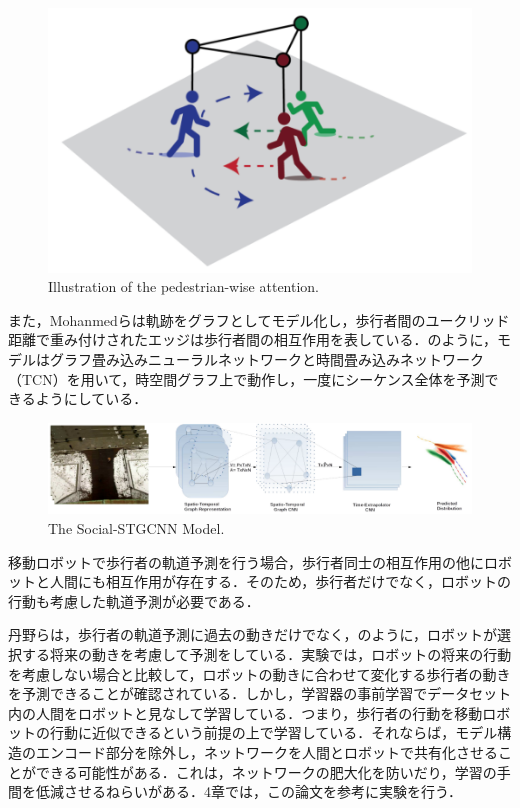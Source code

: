 \begin{figure}[hbtp]
     \centering
    \includegraphics[keepaspectratio, scale=0.4]
         {images/s-bigat.png}
    \caption{Illustration of the pedestrian-wise attention.\protect\footnotemark[3]}
    \label{Fig:s-bigat}
\end{figure}

\protect{}

また，Mohanmedら\cite{s-stgcnn}は軌跡をグラフとしてモデル化し，歩行者間のユークリッド距離で重み付けされたエッジは歩行者間の相互作用を表している．のように，モデルはグラフ畳み込みニューラルネットワークと時間畳み込みネットワーク（TCN）を用いて，時空間グラフ上で動作し，一度にシーケンス全体を予測できるようにしている．

\begin{figure}[hbtp]
     \centering
    \includegraphics[keepaspectratio, scale=0.39]
         {images/s-stgcnn.png}
    \caption{The Social-STGCNN Model.\protect\footnotemark[4]}
    \label{Fig:s-stgcnn}
\end{figure}

\protect{}

\newpage

移動ロボットで歩行者の軌道予測を行う場合，歩行者同士の相互作用の他にロボットと人間にも相互作用が存在する．そのため，歩行者だけでなく，ロボットの行動も考慮した軌道予測が必要である．

丹野ら\cite{si2023-tanno}は，歩行者の軌道予測に過去の動きだけでなく，のように，ロボットが選択する将来の動きを考慮して予測をしている．実験では，ロボットの将来の行動を考慮しない場合と比較して，ロボットの動きに合わせて変化する歩行者の動きを予測できることが確認されている．しかし，学習器の事前学習でデータセット内の人間をロボットと見なして学習している．つまり，歩行者の行動を移動ロボットの行動に近似できるという前提の上で学習している．それならば，モデル構造のエンコード部分を除外し，ネットワークを人間とロボットで共有化させることができる可能性がある．これは，ネットワークの肥大化を防いだり，学習の手間を低減させるねらいがある．4章では，この論文を参考に実験を行う．

